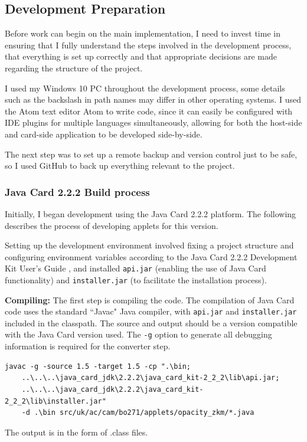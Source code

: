 \documentclass[12pt,a4paper]{article}
\begin{document}



\subsection{Development Preparation}
Before work can begin on the main implementation, I need to invest time in ensuring that I fully understand the steps involved in the development process, that everything is set up correctly and that appropriate decisions are made regarding the structure of the project.

I used my Windows 10 PC throughout the development process, some details such as the backslash in path names may differ in other operating systems. I used the Atom text editor Atom to write code, since it can easily be configured with IDE plugins for multiple languages simultaneously, allowing for both the host-side and card-side application to be developed side-by-side.

The next step was to set up a remote backup and version control just to be safe, so I used GitHub to back up everything relevant to the project.

\subsubsection{Java Card 2.2.2 Build process}
\label{build_process}
Initially, I began development using the Java Card 2.2.2 platform. The following describes the process of developing applets for this version.

Setting up the development environment involved fixing a project structure and configuring environment variables according to the Java Card 2.2.2 Development Kit User's Guide \cite{jcdk_guide}, and installed \verb|api.jar| (enabling the use of Java Card functionality) and \verb|installer.jar| (to facilitate the installation process).

\textbf{Compiling:} The first step is compiling the code. The compilation of Java Card code uses the standard ``Javac" Java compiler, with \verb|api.jar| and \verb|installer.jar| included in the classpath. The source and output should be a version compatible with the Java Card version used. The \verb|-g| option to generate all debugging information is required for the converter step.
\begin{verbatim}
javac -g -source 1.5 -target 1.5 -cp ".\bin;
    ..\..\..\java_card_jdk\2.2.2\java_card_kit-2_2_2\lib\api.jar;
    ..\..\..\java_card_jdk\2.2.2\java_card_kit-2_2_2\lib\installer.jar" 
    -d .\bin src/uk/ac/cam/bo271/applets/opacity_zkm/*.java 
\end{verbatim}
The output is in the form of .class files.
\end{document}
